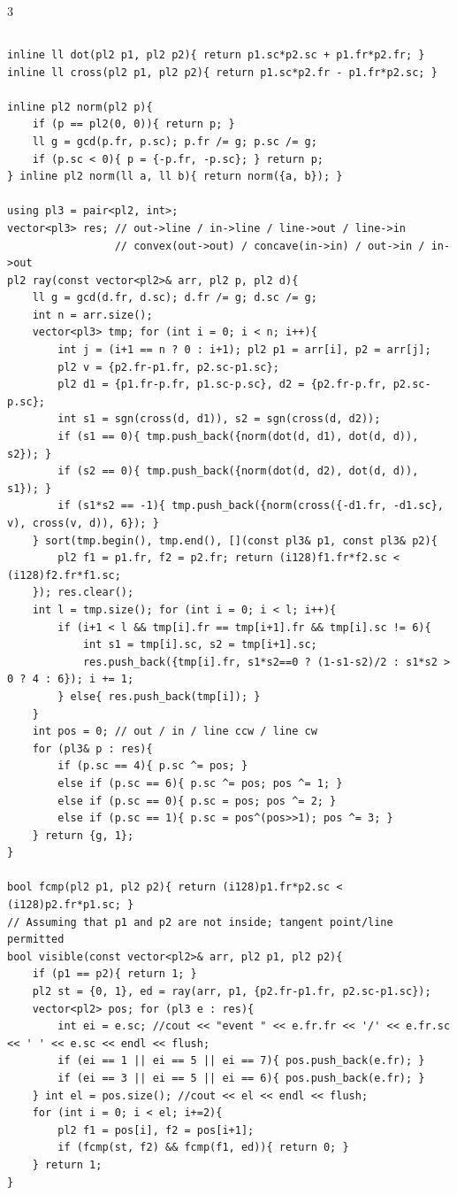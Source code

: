 \documentclass[landscape, 8pt, a4paper, oneside]{extarticle}
\begin{document}
\begin{multicols*}{3}
\subsection{}
\begin{verbatim}
inline ll dot(pl2 p1, pl2 p2){ return p1.sc*p2.sc + p1.fr*p2.fr; }
inline ll cross(pl2 p1, pl2 p2){ return p1.sc*p2.fr - p1.fr*p2.sc; }

inline pl2 norm(pl2 p){
	if (p == pl2(0, 0)){ return p; }
	ll g = gcd(p.fr, p.sc); p.fr /= g; p.sc /= g;
	if (p.sc < 0){ p = {-p.fr, -p.sc}; } return p;
} inline pl2 norm(ll a, ll b){ return norm({a, b}); }

using pl3 = pair<pl2, int>;
vector<pl3> res; // out->line / in->line / line->out / line->in
                 // convex(out->out) / concave(in->in) / out->in / in->out
pl2 ray(const vector<pl2>& arr, pl2 p, pl2 d){
	ll g = gcd(d.fr, d.sc); d.fr /= g; d.sc /= g;
	int n = arr.size();
	vector<pl3> tmp; for (int i = 0; i < n; i++){
		int j = (i+1 == n ? 0 : i+1); pl2 p1 = arr[i], p2 = arr[j];
		pl2 v = {p2.fr-p1.fr, p2.sc-p1.sc};
		pl2 d1 = {p1.fr-p.fr, p1.sc-p.sc}, d2 = {p2.fr-p.fr, p2.sc-p.sc};
		int s1 = sgn(cross(d, d1)), s2 = sgn(cross(d, d2));
		if (s1 == 0){ tmp.push_back({norm(dot(d, d1), dot(d, d)), s2}); }
		if (s2 == 0){ tmp.push_back({norm(dot(d, d2), dot(d, d)), s1}); }
		if (s1*s2 == -1){ tmp.push_back({norm(cross({-d1.fr, -d1.sc}, v), cross(v, d)), 6}); }
	} sort(tmp.begin(), tmp.end(), [](const pl3& p1, const pl3& p2){
		pl2 f1 = p1.fr, f2 = p2.fr; return (i128)f1.fr*f2.sc < (i128)f2.fr*f1.sc;
	}); res.clear();
	int l = tmp.size(); for (int i = 0; i < l; i++){
		if (i+1 < l && tmp[i].fr == tmp[i+1].fr && tmp[i].sc != 6){
			int s1 = tmp[i].sc, s2 = tmp[i+1].sc;
			res.push_back({tmp[i].fr, s1*s2==0 ? (1-s1-s2)/2 : s1*s2 > 0 ? 4 : 6}); i += 1;
		} else{ res.push_back(tmp[i]); }
	}
	int pos = 0; // out / in / line ccw / line cw
	for (pl3& p : res){
		if (p.sc == 4){ p.sc ^= pos; }
		else if (p.sc == 6){ p.sc ^= pos; pos ^= 1; }
		else if (p.sc == 0){ p.sc = pos; pos ^= 2; }
		else if (p.sc == 1){ p.sc = pos^(pos>>1); pos ^= 3; }
	} return {g, 1};
}

bool fcmp(pl2 p1, pl2 p2){ return (i128)p1.fr*p2.sc < (i128)p2.fr*p1.sc; }
// Assuming that p1 and p2 are not inside; tangent point/line permitted
bool visible(const vector<pl2>& arr, pl2 p1, pl2 p2){
	if (p1 == p2){ return 1; }
	pl2 st = {0, 1}, ed = ray(arr, p1, {p2.fr-p1.fr, p2.sc-p1.sc});
	vector<pl2> pos; for (pl3 e : res){
		int ei = e.sc; //cout << "event " << e.fr.fr << '/' << e.fr.sc << ' ' << e.sc << endl << flush;
		if (ei == 1 || ei == 5 || ei == 7){ pos.push_back(e.fr); }
		if (ei == 3 || ei == 5 || ei == 6){ pos.push_back(e.fr); }
	} int el = pos.size(); //cout << el << endl << flush;
	for (int i = 0; i < el; i+=2){
		pl2 f1 = pos[i], f2 = pos[i+1];
		if (fcmp(st, f2) && fcmp(f1, ed)){ return 0; }
	} return 1;
}
\end{verbatim}

\end{multicols*}
\end{document}
